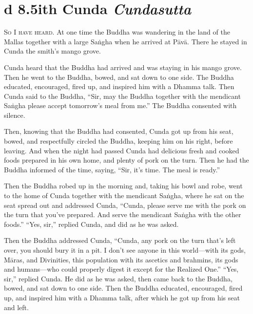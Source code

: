 \documentclass[12pt,openany]{book}%
\newcommand*{\suttatitleacronym}[1]{\smaller[2]{#1}\vspace*{.3em}}
\newcommand*{\suttatitletranslation}[1]{\linebreak{#1}}
\newcommand*{\suttatitleroot}[1]{\linebreak\smaller[2]\itshape{#1}}
\newcommand*{\tocacronym}[1]{\hspace*{-3.3em}{#1}\quad}
\newcommand*{\toctranslation}[1]{#1}
\newcommand*{\tocroot}[1]{(\textit{#1})}
\newcommand*{\scevam}[1]{\textsc{#1}}
\begin{document}
%
\section*{{\suttatitleacronym Ud 8.5}{\suttatitletranslation With Cunda }{\suttatitleroot Cundasutta}}
\addcontentsline{toc}{section}{\tocacronym{Ud 8.5} \toctranslation{With Cunda } \tocroot{Cundasutta}}

\scevam{So I have heard. }At one time the Buddha was wandering in the land of the Mallas together with a large \textsanskrit{Saṅgha} when he arrived at \textsanskrit{Pāvā}. There he stayed in Cunda the smith’s mango grove. 

Cunda heard that the Buddha had arrived and was staying in his mango grove. Then he went to the Buddha, bowed, and sat down to one side. The Buddha educated, encouraged, fired up, and inspired him with a Dhamma talk. Then Cunda said to the Buddha, “Sir, may the Buddha together with the mendicant \textsanskrit{Saṅgha} please accept tomorrow’s meal from me.” The Buddha consented with silence. 

Then, knowing that the Buddha had consented, Cunda got up from his seat, bowed, and respectfully circled the Buddha, keeping him on his right, before leaving. And when the night had passed Cunda had delicious fresh and cooked foods prepared in his own home, and plenty of pork on the turn. Then he had the Buddha informed of the time, saying, “Sir, it’s time. The meal is ready.” 

Then the Buddha robed up in the morning and, taking his bowl and robe, went to the home of Cunda together with the mendicant \textsanskrit{Saṅgha}, where he sat on the seat spread out and addressed Cunda, “Cunda, please serve me with the pork on the turn that you’ve prepared. And serve the mendicant \textsanskrit{Saṅgha} with the other foods.” “Yes, sir,” replied Cunda, and did as he was asked. 

Then the Buddha addressed Cunda, “Cunda, any pork on the turn that’s left over, you should bury it in a pit. I don’t see anyone in this world—with its gods, \textsanskrit{Māras}, and Divinities, this population with its ascetics and brahmins, its gods and humans—who could properly digest it except for the Realized One.” “Yes, sir,” replied Cunda. He did as he was asked, then came back to the Buddha, bowed, and sat down to one side. Then the Buddha educated, encouraged, fired up, and inspired him with a Dhamma talk, after which he got up from his seat and left. 
\end{document}
